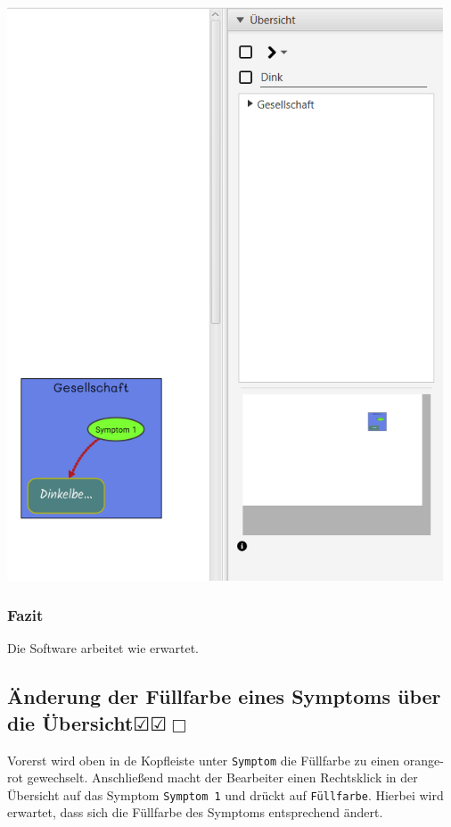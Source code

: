 \documentclass[enabledeprecatedfontcommands]{scrartcl}
\newcommand{\subsectiont}[2]{\subsection[#1]{#1{\normalsize\normalfont #2}}}
\newcommand{\leer}{$\Box$}
\newcommand{\ok}{$\CheckedBox$}
\begin{document}
\begin{center}
\includegraphics[height=17cm]{relationArtNachher.PNG}
\end{center}
\subsubsection{Fazit}
Die Software arbeitet wie erwartet.

\subsectiont{Änderung der Füllfarbe eines Symptoms über die Übersicht}{\dotfill\ok\ok\leer}
Vorerst wird oben in de Kopfleiste unter \texttt{Symptom} die Füllfarbe zu einen orange-rot gewechselt. Anschließend macht der Bearbeiter einen Rechtsklick in der Übersicht auf das Symptom \texttt{Symptom 1} und drückt auf \texttt{Füllfarbe}. Hierbei wird erwartet, dass sich die Füllfarbe des Symptoms entsprechend ändert.  
\end{document}
